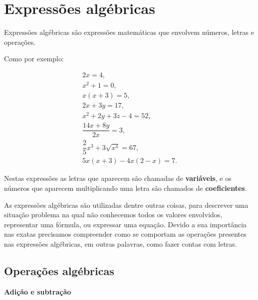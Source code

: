 
\chapter{Expressões algébricas}

   \vskip0.3cm
 \colorbox{azul}{
 \begin{minipage}{0.9\linewidth}
 \begin{center}
  Expressões algébricas são expressões matemáticas que envolvem números, letras e operações.
 \end{center}
 \end{minipage}}
 \vskip0.3cm

 Como por exemplo:

 \begin{eqnarray*}
  2x=4,\\
  x^2+1=0,\\
  x(x+3)=5,\\
  2x+3y=17,\\
  x^2 + 2y + 3z -4= 52, \\
  \dfrac{14x + 8y}{2x}= 3, \\
  \dfrac{2}{5}x^3 + 3\sqrt{x^4}= 67, \\
  5x(x+3)-4x(2-x)=7.
 \end{eqnarray*}

 Nestas expressões as letras que aparecem são chamadas de \textbf{variáveis}, e os números que aparecem multiplicando uma letra são chamados de \textbf{coeficientes}.

 As expressões algébricas são utilizadas dentre outras coisas, para descrever uma situação problema na qual não conhecemos todos os valores envolvidos, representar uma fórmula, ou expressar uma equação. Devido a sua importância nas exatas precisamos compreender como se comportam as operações presentes nas expressões algébricas, em outras palavras, como fazer contas com letras.

\section{Operações algébricas}

 \vskip0.3cm

 \textbf{Adição e subtração}

